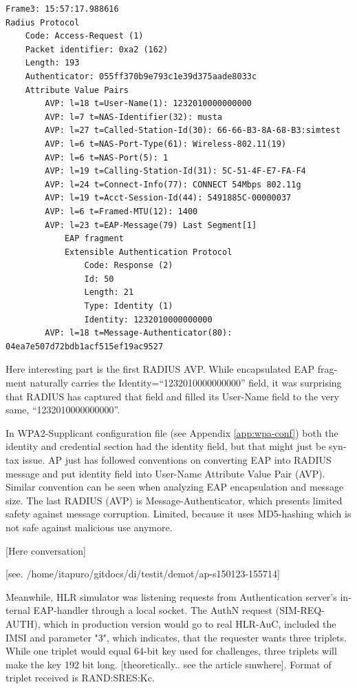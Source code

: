 \documentclass[12pt,a4paper,english]{tutthesis}
\begin{document}
\begin{otherlanguage}{english}
\scriptsize
\begin{verbatim}
Frame3: 15:57:17.988616
Radius Protocol
    Code: Access-Request (1)
    Packet identifier: 0xa2 (162)
    Length: 193
    Authenticator: 055ff370b9e793c1e39d375aade8033c
    Attribute Value Pairs
        AVP: l=18 t=User-Name(1): 1232010000000000
        AVP: l=7 t=NAS-Identifier(32): musta
        AVP: l=27 t=Called-Station-Id(30): 66-66-B3-8A-68-B3:simtest
        AVP: l=6 t=NAS-Port-Type(61): Wireless-802.11(19)
        AVP: l=6 t=NAS-Port(5): 1
        AVP: l=19 t=Calling-Station-Id(31): 5C-51-4F-E7-FA-F4
        AVP: l=24 t=Connect-Info(77): CONNECT 54Mbps 802.11g
        AVP: l=19 t=Acct-Session-Id(44): 5491885C-00000037
        AVP: l=6 t=Framed-MTU(12): 1400
        AVP: l=23 t=EAP-Message(79) Last Segment[1]
            EAP fragment
            Extensible Authentication Protocol
                Code: Response (2)
                Id: 50
                Length: 21
                Type: Identity (1)
                Identity: 1232010000000000
        AVP: l=18 t=Message-Authenticator(80): 04ea7e507d72bdb1acf515ef19ac9527
\end{verbatim}
\normalsize
Here interesting part is the first RADIUS AVP.
While encapsulated EAP fragment naturally carries the Identity=``1232010000000000''
field, it was surprising that RADIUS has captured that field and 
filled its User-Name field to the very same, ``1232010000000000''. 

In WPA2-Supplicant configuration file (see Appendix \ref{app:wpa-conf}) both the identity and
credential section had the identity field, but that might 
just be syntax issue.
AP just has followed conventions on converting
EAP into RADIUS message and put identity field into User-Name
Attribute Value Pair (AVP).
Similar convention can be seen when analyzing EAP encapsulation and
message size. The last RADIUS (AVP) is 
Message-Authenticator, which presents limited safety against message 
corruption. Limited, because it uses MD5-hashing which is not safe
against malicious use anymore.

[Here conversation]



[see. /home/itapuro/gitdocs/di/testit/demot/ap-s150123-155714]

Meanwhile, HLR simulator was listening requests from Authentication
server's internal EAP-handler through a local socket.
The AuthN request (SIM-REQ-AUTH), which in production version would go
to real HLR-AuC, included the IMSI and parameter
"3", which indicates, that the requester wants three triplets. 
While one triplet would equal 64-bit key used for challenges, three
triplets will make the key 192 bit long. [theoretically.. see the
article smwhere].  Format of triplet received is RAND:SRES:Kc.


\end{otherlanguage}
\end{document}
